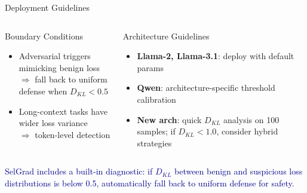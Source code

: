 \documentclass[aspectratio=169, 11pt]{beamer}
\newcommand{\takeaway}[1]{%
\vfill
\begin{center}
\colorbox{darkblue!8}{\parbox{0.92\textwidth}{\centering\small\textcolor{darkblue}{#1}}}
\end{center}
}
\begin{document}
\begin{frame}{Deployment Guidelines}
\vspace{8pt}
\begin{columns}[T]
\begin{alertblock}{Boundary Conditions}
\begin{itemize}
  \item Adversarial triggers mimicking benign loss\\
        $\Rightarrow$ fall back to uniform defense when $D_{KL} < 0.5$
  \item Long-context tasks have wider loss variance\\
        $\Rightarrow$ token-level detection
\end{itemize}
\end{alertblock}

\begin{exampleblock}{Architecture Guidelines}
\begin{itemize}
  \item \textbf{Llama-2, Llama-3.1}: deploy with default params
  \item \textbf{Qwen}: architecture-specific threshold calibration
  \item \textbf{New arch}: quick $D_{KL}$ analysis on 100 samples; if $D_{KL} < 1.0$, consider hybrid strategies
\end{itemize}
\end{exampleblock}
\end{columns}
\takeaway{SelGrad includes a built-in diagnostic: if $D_{KL}$ between benign and suspicious loss distributions is below 0.5, automatically fall back to uniform defense for safety.}
\end{frame}
\end{document}
